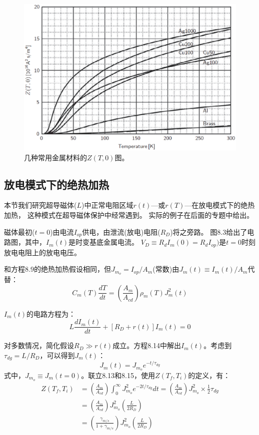 \begin{figure}
	\centering
	\includegraphics[scale=0.5]{chpt8/figs/fig8.2.eps}
	\caption{几种常用金属材料的$Z(T, 0)$图。}
\end{figure}

\subsection{放电模式下的绝热加热}
本节我们研究超导磁体($L$)中正常电阻区域$r(t)$---或$r(T)$---在放电模式下的绝热加热，
这种模式在超导磁体保护中经常遇到。
实际的例子在后面的专题中给出。

磁体最初($t=0$)由电流$I_{op}$供电，由泄流(放电)电阻($R_D$)将之旁路。
图8.3给出了电路图，其中，$I_m(t)$是时变基底金属电流。
$V_D\equiv R_d I_m(0)=R_d I_{op})$是$t=0$时刻放电电阻上的放电电压。

和方程8.9的绝热加热假设相同，但$J_{m_o}=I_{op}/A_m$(常数)由$J_m(t)\equiv I_m(t)/A_m$代替：
\begin{equation}%
C_m(T)\frac{dT}{dt}=\left(\frac{A_m}{A_{cd}}\right)\rho_m(T)J_{m}^{2}(t)
\end{equation}

$I_m(t)$的电路方程为：
\begin{equation}%
L\frac{dI_m(t)}{dt}+[R_D+r(t)]I_m(t)=0
\end{equation}

对多数情况，简化假设$R_D\gg r(t)$成立。方程8.14中解出$I_m(t)$。考虑到$\tau_{dg}=L/R_D$，可以得到$J_m(t)$：
\begin{equation}%
J_m(t)=J_{m_o}e^{-t/\tau_{dg}}
\end{equation}
式中，$J_{m_o}\equiv J_{m}(t=0)$。联立8.13和8.15，使用$Z(T_f,T_i)$的定义，有：
\begin{subequations}%
	\begin{align}
Z(T_f,T_i)&=\left(\frac{A_m}{A_{cd}}\right)\int_{0}^{\infty}J_{m_o}^{2}e^{-2t/\tau_{dg}}dt=\left(\frac{A_m}{A_{cd}}\right)J_{m_o}^{2}\times\frac{1}{2}\tau_{dg} \\
&=\left(\frac{A_m}{A_{cd}}\right)J_{m_o}^{2}\left(\frac{L}{2R_D}\right)\\ 
&=\left(\frac{\gamma_{m/s}}{1+\gamma_{m/s}}\right)J_{m_o}^{2}\left(\frac{L}{2R_D}\right)
\end{align}
\end{subequations}

